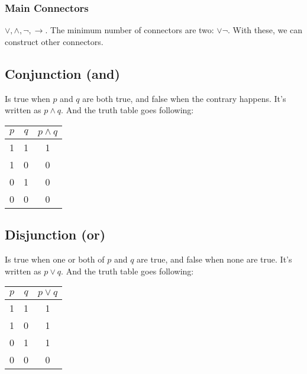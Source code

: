 \documentclass{report}
\begin{document}
    \subsubsection{Main Connectors}
        $\lor, \land, \neg, \rightarrow$. The minimum number of connectors are two: $\lor \neg$. With these, we can construct other connectors.

    \subsection{Conjunction (and)}
        Is true when $p$ and $q$ are both true, and false when the contrary happens. It's written as $p \land q$. And the truth table goes following:

        \begin{table}[h]
            \centering
            \begin{tabular}{|c|c|c|}
            \hline
            $p$ & $q$ & $p \land q$ \\ \hline
            1 & 1 & 1                        \\ \hline
            1 & 0 & 0                        \\ \hline
            0 & 1 & 0                        \\ \hline
            0 & 0 & 0                        \\ \hline
            \end{tabular}
        \end{table}

    \subsection{Disjunction (or)}
        Is true when one or both of $p$ and $q$ are true, and false when none are true. It's written as $p \lor q$. And the truth table goes following:

        \begin{table}[h]
            \centering
            \begin{tabular}{|c|c|c|}
            \hline
            $p$ & $q$ & $p \lor q$ \\ \hline
            1 & 1 & 1                        \\ \hline
            1 & 0 & 1                        \\ \hline
            0 & 1 & 1                        \\ \hline
            0 & 0 & 0                        \\ \hline
            \end{tabular}
        \end{table}
\end{document}
